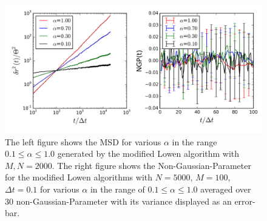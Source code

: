 \documentclass[
  a4paper,BCOR10mm,twoside,
  headsepline,footsepline,%
  fleqn,openbib
]{scrbook}
\begin{document}
\begin{figure}[h]
\centering
\includegraphics[width=\textwidth]{./data/nongaussianlowenalphaneumodifed.png}
\caption{The left figure shows the MSD for various $\alpha$ in the range $0.1\leq\alpha\leq1.0$ generated by the modified Lowen algorithm with $M,N=2000$.\newline
The right figure shows the  Non-Gaussian-Parameter for the modified Lowen algorithms with  $N=5000$, $M=100$, $\Delta t = 0.1$ for various $\alpha$ in the range of $0.1\leq\alpha\leq1.0$ averaged over $30$ non-Gaussian-Parameter with its variance displayed as an error-bar.}
\label{nongaussianlowenmodif}
\end{figure}
\end{document}
